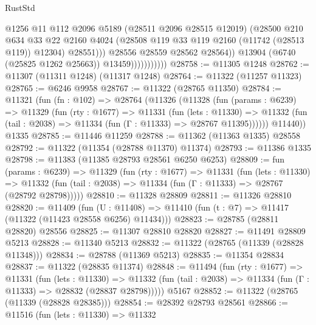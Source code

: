\begin{lexlean}{RustStd}
\begin{coremodule}
                                  @1256
                                  @11
                                  @112
                                  @2096
                                  @5189
                                  (@28511 @2096 @28515 @12019)
                                  (@28500
                                    @210
                                    @634
                                    @33
                                    @22
                                    @2160
                                    @4024
                                    (@28508 @119 @33 @119 @2160 (@11742 (@28513 @119)) @12304)
                                    @28551)))
                              @28556
                              @28559
                              @28562
                              @28564))
                          @13904
                          (@6740 (@25825 @1262 @25663))
                          @13459)))))))))))
@28758 := @11305 @1248
@28762 := @11307 (@11311 @1248) (@11317 @1248)
@28764 := @11322 (@11257 @11323)
@28765 := @6246 @9958
@28767 := @11322 (@28765 @11350)
@28784 := @11321
    (fun (fn : @102) =>
    @28764
      (@11326
        (@11328
          (fun (params : @6239) =>
          @11329
            (fun (rty : @1677) =>
            @11331
              (fun (lets : @11330) =>
              @11332 (fun (tail : @2038) => @11334 (fun (Γ : @11333) => @28767 @11395))))))
        @11440))
    @1335
@28785 := @11446 @11259
@28788 := @11362 (@11363 @1335) @28558
@28792 := @11322 (@11354 (@28788 @11370) @11374)
@28793 := @11386 @1335
@28798 := @11383 (@11385 @28793 @28561 @6250 @6253)
@28809 := fun (params : @6239) =>
  @11329
    (fun (rty : @1677) =>
    @11331
      (fun (lets : @11330) =>
      @11332 (fun (tail : @2038) => @11334 (fun (Γ : @11333) => @28767 (@28792 @28798)))))
@28810 := @11328 @28809
@28811 := @11326 @28810
@28820 := @11409
    (fun (U : @11408) => @11410 (fun (t : @7) => @11417 (@11322 (@11423 @28558 @6256) @11434)))
@28823 := @28785 (@28811 @28820) @28556
@28825 := @11307 @28810 @28820
@28827 := @11491 @28809 @5213
@28828 := @11340 @5213
@28832 := @11322 (@28765 (@11339 (@28828 @11348)))
@28834 := @28788 (@11369 @5213)
@28835 := @11354 @28834
@28837 := @11322 (@28835 @11374)
@28848 := @11494
    (fun (rty : @1677) =>
    @11331
      (fun (lets : @11330) =>
      @11332 (fun (tail : @2038) => @11334 (fun (Γ : @11333) => @28832 (@28837 @28798)))))
    @5167
@28852 := @11322 (@28765 (@11339 (@28828 @28385)))
@28854 := @28392 @28793 @28561
@28866 := @11516
    (fun (lets : @11330) =>
    @11332

\end{coremodule}
\end{lexlean}
